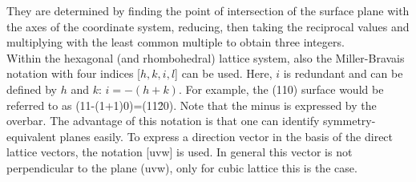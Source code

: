 \documentclass[11pt,DIV=13,BCOR=5mm,a4paper,headinclude]{scrbook}
\begin{document}
They are determined by finding the point of intersection of the surface plane with the axes of the coordinate system, reducing, then taking the reciprocal values and multiplying with the least common multiple to obtain three integers.
\\
Within the hexagonal (and rhombohedral) lattice system, also the Miller-Bravais notation with four indices [$h,k,i,l$] can be used.
Here, $i$ is redundant and can be defined by $h$ and $k$: $i=-(h+k)$.
For example, the (110) surface would be referred to as (11-(1+1)0)=(11\=20).
Note that the minus is expressed by the overbar.
The advantage of this notation is that one can identify symmetry-equivalent planes easily.
To express a direction vector in the basis of the direct lattice vectors, the notation [uvw] is used.
In general this vector is not perpendicular to the plane (uvw), only for cubic lattice this is the case.
\\
\end{document}
